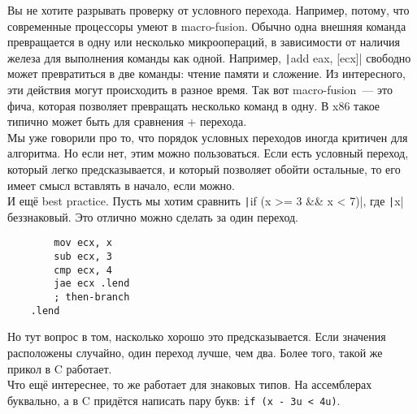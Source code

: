 \documentclass{article}
\begin{document}
    Вы не хотите разрывать проверку от условного перехода. Например, потому, что современные процессоры умеют в macro-fusion. Обычно одна внешняя команда превращается в одну или несколько микроопераций, в зависимости от наличия железа для выполнения команды как одной. Например, \texttt|add eax, [ecx]| свободно может превратиться в две команды: чтение памяти и сложение. Из интересного, эти действия могут происходить в разное время. Так вот macro-fusion~--- это фича, которая позволяет превращать несколько команд в одну. В x86 такое типично может быть для сравнения + перехода.\\
    Мы уже говорили про то, что порядок условных переходов иногда критичен для алгоритма. Но если нет, этим можно пользоваться. Если есть условный переход, который легко предсказывается, и который позволяет обойти остальные, то его имеет смысл вставлять в начало, если можно.\\
    И ещё best practice. Пусть мы хотим сравнить \texttt|if (x >= 3 && x < 7)|, где \texttt|x| беззнаковый. Это отлично можно сделать за один переход.
    \begin{verbatim}
        mov ecx, x
        sub ecx, 3
        cmp ecx, 4
        jae ecx .lend
        ; then-branch
    .lend
    \end{verbatim}
    Но тут вопрос в том, насколько хорошо это предсказывается. Если значения расположены случайно, один переход лучше, чем два. Более того, такой же прикол в C работает.\\
    Что ещё интереснее, то же работает для знаковых типов. На ассемблерах буквально, а в C придётся написать пару букв: \Verb|if (x - 3u < 4u)|.
\end{document}
